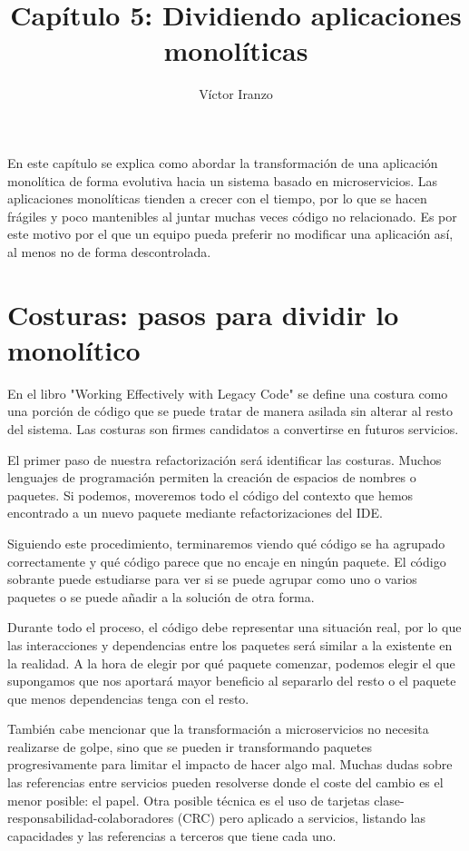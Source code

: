 \documentclass[11pt,a4paper]{article}
\author{Víctor Iranzo}
\title{Capítulo 5: Dividiendo aplicaciones monolíticas}
\begin{document}
\maketitle

En este capítulo se explica como abordar la transformación de una aplicación monolítica de forma evolutiva hacia un sistema basado en microservicios. Las aplicaciones monolíticas tienden a crecer con el tiempo, por lo que se hacen frágiles y poco mantenibles al juntar muchas veces código no relacionado. Es por este motivo por el que un equipo pueda preferir no modificar una aplicación así, al menos no de forma descontrolada.

\section{Costuras: pasos para dividir lo monolítico}

En el libro "Working Effectively with Legacy Code" se define una costura como una porción de código que se puede tratar de manera asilada sin alterar al resto del sistema. Las costuras son firmes candidatos a convertirse en futuros servicios.

El primer paso de nuestra refactorización será identificar las costuras. Muchos lenguajes de programación permiten la creación de espacios de nombres o paquetes. Si podemos, moveremos todo el código del contexto que hemos encontrado a un nuevo paquete mediante refactorizaciones del IDE. 

Siguiendo este procedimiento, terminaremos viendo qué código se ha agrupado correctamente y qué código parece que no encaje en ningún paquete. El código sobrante puede estudiarse para ver si se puede agrupar como uno o varios paquetes o se puede añadir a la solución de otra forma. 

Durante todo el proceso, el código debe representar una situación real, por lo que las interacciones y dependencias entre los paquetes será similar a la existente en la realidad. A la hora de elegir por qué paquete comenzar, podemos elegir el que supongamos que nos aportará mayor beneficio al separarlo del resto o el paquete que menos dependencias tenga con el resto.

También cabe mencionar que la transformación a microservicios no necesita realizarse de golpe, sino que se pueden ir transformando paquetes progresivamente para limitar el impacto de hacer algo mal. Muchas dudas sobre las referencias entre servicios pueden resolverse donde el coste del cambio es el menor posible: el papel. Otra posible técnica es el uso de tarjetas clase-responsabilidad-colaboradores (CRC) pero aplicado a servicios, listando las capacidades y las referencias a terceros que tiene cada uno. 
\end{document}
